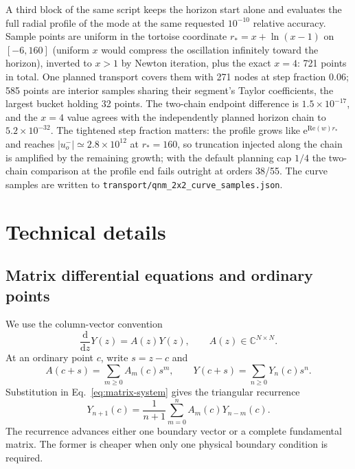 \documentclass[11pt]{article}
\newcommand{\dd}{\mathrm d}
\begin{document}
A third block of the same script keeps the horizon start alone and evaluates the full
radial profile of the mode at the same requested $10^{-10}$ relative accuracy.  Sample
points are uniform in the tortoise coordinate $r_\ast=x+\ln(x-1)$ on $[-6,160]$ (uniform
$x$ would compress the oscillation infinitely toward the horizon), inverted to $x>1$ by
Newton iteration, plus the exact $x=4$: 721 points in total.  One planned transport
covers them with 271 nodes at step fraction $0.06$; 585 points are interior samples
sharing their segment's Taylor coefficients, the largest bucket holding 32 points.  The
two-chain endpoint difference is $1.5\times10^{-17}$, and the $x=4$ value agrees with the
independently planned horizon chain to $5.2\times10^{-32}$.  The tightened step fraction
matters: the profile grows like $\mathrm{e}^{\mathrm{Re}(w)r_\ast}$ and reaches
$|u^-_o|\simeq2.8\times10^{12}$ at $r_\ast=160$, so truncation injected along the chain is
amplified by the remaining growth; with the default planning cap $1/4$ the two-chain
comparison at the profile end fails outright at orders 38/55.  The curve samples are
written to \texttt{transport/qnm\_2x2\_curve\_samples.json}.

\section{Technical details}
\label{sec:technical-details}

\subsection{Matrix differential equations and ordinary points}
\label{subsec:ordinary}

We use the column-vector convention
\begin{equation}
  \frac{\dd}{\dd z}Y(z)=A(z)Y(z),
  \qquad A(z)\in\mathbb C^{N\times N}.
  \label{eq:matrix-system}
\end{equation}
At an ordinary point $c$, write $s=z-c$ and
\begin{equation}
  A(c+s)=\sum_{m\geq0}A_m(c)s^m,
  \qquad
  Y(c+s)=\sum_{n\geq0}Y_n(c)s^n.
\end{equation}
Substitution in Eq.~\eqref{eq:matrix-system} gives the triangular recurrence
\begin{equation}
  Y_{n+1}(c)=\frac{1}{n+1}\sum_{m=0}^{n}A_m(c)Y_{n-m}(c).
  \label{eq:ordinary-recurrence}
\end{equation}
The recurrence advances either one boundary vector or a complete fundamental matrix.  The
former is cheaper when only one physical boundary condition is required.
\end{document}
